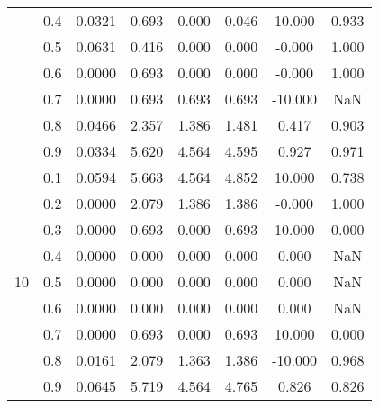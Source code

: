 \documentclass[11pt,a4paper]{report}
\begin{document}
\begin{longtable}{ | c | c || c | c | c | c | c | c | }
 & 0.4 & 0.0321 & 0.693 & 0.000 & 0.046 & 10.000 & 0.933 \\
 & 0.5 & 0.0631 & 0.416 & 0.000 & 0.000 & -0.000 & 1.000 \\
 & 0.6 & 0.0000 & 0.693 & 0.000 & 0.000 & -0.000 & 1.000 \\
 & 0.7 & 0.0000 & 0.693 & 0.693 & 0.693 & -10.000 & NaN \\
 & 0.8 & 0.0466 & 2.357 & 1.386 & 1.481 & 0.417 & 0.903 \\
 & 0.9 & 0.0334 & 5.620 & 4.564 & 4.595 & 0.927 & 0.971 \\
 \hline
\multirow{9}{*}{10} & 0.1 & 0.0594 & 5.663 & 4.564 & 4.852 & 10.000 & 0.738 \\
 & 0.2 & 0.0000 & 2.079 & 1.386 & 1.386 & -0.000 & 1.000 \\
 & 0.3 & 0.0000 & 0.693 & 0.000 & 0.693 & 10.000 & 0.000 \\
 & 0.4 & 0.0000 & 0.000 & 0.000 & 0.000 & 0.000 & NaN \\
 & 0.5 & 0.0000 & 0.000 & 0.000 & 0.000 & 0.000 & NaN \\
 & 0.6 & 0.0000 & 0.000 & 0.000 & 0.000 & 0.000 & NaN \\
 & 0.7 & 0.0000 & 0.693 & 0.000 & 0.693 & 10.000 & 0.000 \\
 & 0.8 & 0.0161 & 2.079 & 1.363 & 1.386 & -10.000 & 0.968 \\
 & 0.9 & 0.0645 & 5.719 & 4.564 & 4.765 & 0.826 & 0.826 \\
 \hline
\hline
\end{longtable}
\end{document}
